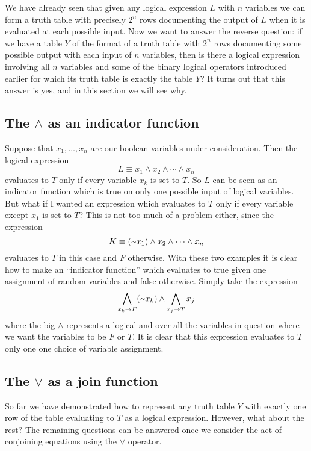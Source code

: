 We have already seen that given any logical expression $L$ with $n$ variables we can form a truth table with precisely $2^n$ rows documenting the output of $L$ when it is evaluated at each possible input. Now we want to answer the reverse question: if we have a table $Y$ of the format of a truth table with $2^n$ rows documenting some possible output with each input of $n$ variables, then is there a logical expression involving all $n$ variables and some of the binary logical operators introduced earlier for which its truth table is exactly the table $Y$? It turns out that this answer is yes, and in this section we will see why.

\subsection{The $\land$ as an indicator function}

Suppose that $x_1, \dots, x_n$ are our boolean variables under consideration. Then the logical expression 
\[L \equiv x_1 \land x_2 \land \cdots \land x_n\] evaluates to $T$ only if every variable $x_k$ is set to $T$. So $L$ can be seen as an indicator function which is true on only one possible input of logical variables. But what if I wanted an expression which evaluates to $T$ only if every variable except $x_1$ is set to $T$? This is not too much of a problem either, since the expression
\[K \equiv (\shortsim x_1) \land x_2 \land\cdots \land x_n\] evaluates to $T$ in this case and $F$ otherwise. With these two examples it is clear how to make an ``indicator function'' which evaluates to true given one assignment of random variables and false otherwise. Simply take the expression
\[\bigwedge\limits_{x_k \rightarrow F}(\shortsim x_k) \land \bigwedge\limits_{x_j \rightarrow T}x_j\]
where the big $\land$ represents a logical and over all the variables in question where we want the variables to be $F$ or $T$. It is clear that this expression evaluates to $T$ only one one choice of variable assignment.

\subsection{The $\lor$ as a join function}

So far we have demonstrated how to represent any truth table $Y$ with exactly one row of the table evaluating to $T$ as a logical expression. However, what about the rest? The remaining questions can be answered once we consider the act of conjoining equations using the $\lor$ operator.

